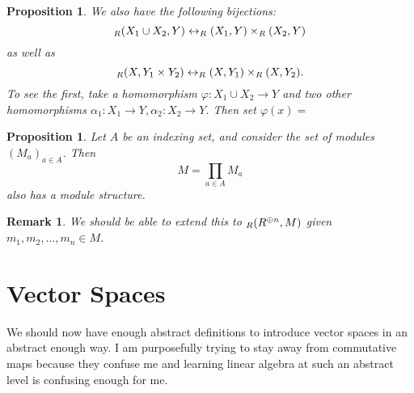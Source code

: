 \documentclass{article}
\theoremstyle{norm}
\newtheorem{rem}[thm]{Remark}
\newtheorem{prop}[thm]{Proposition}
\let\hom\relax
\DeclareMathOperator{\hom}{Hom}
\begin{document}
\begin{prop}
We also have the following bijections:
\[ \hom_R(X_1 \cup X_2, Y) \leftrightarrow \hom_R(X_1, Y) \times
\hom_R(X_2, Y) \]
as well as
\[ \hom_R(X, Y_1 \times Y_2) \leftrightarrow \hom_R(X, Y_1) \times
\hom_R(X, Y_2). \]
To see the first, take a homomorphism $\varphi : X_1 \cup X_2
\rightarrow Y$ and two other homomorphisms $\alpha_1 : X_1 \rightarrow
Y, \alpha_2 : X_2 \rightarrow Y$. Then set $\varphi(x) = $
\end{prop}

\begin{prop}
Let $A$ be an indexing set, and consider the set of modules $(M_a)_{a
\in A}$. Then
\[ M = \prod_{a \in A} M_a \]
also has a module structure.
\end{prop}

\begin{rem}
We should be able to extend this to $\hom_R(R^{\oplus n}, M)$ given
$m_1, m_2, \dots, m_n \in M$.
\end{rem}

\section{Vector Spaces}
We should now have enough abstract definitions to introduce vector
spaces in an abstract enough way. I am purposefully trying to stay away
from commutative maps because they confuse me and learning linear
algebra at such an abstract level is confusing enough for me.
\end{document}
